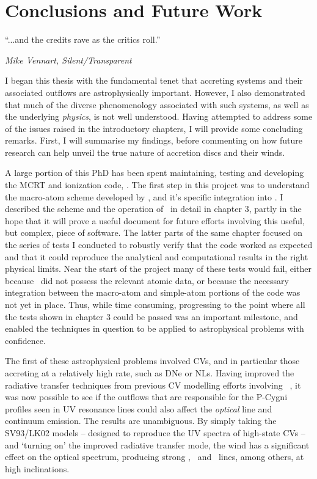\chapter{Conclusions and Future Work}

\epigraph{``...and the credits rave as the critics roll.''}
{{\sl Mike Vennart, Silent/Transparent}}

I began this thesis with the fundamental tenet that accreting systems
and their associated outflows are astrophysically important. However, I also
demonstrated that much of the diverse phenomenology associated with such systems, as well
as the underlying {\em physics}, is not well understood.  
Having attempted to address some of the issues raised in the 
introductory chapters, I will provide some concluding remarks. 
First, I will summarise my findings, before 
commenting on how future research can help unveil the true nature of 
accretion discs and their winds.

A large portion of this PhD has been spent maintaining,
testing and developing the MCRT and ionization code, \py. The first 
step in this project was to understand the macro-atom scheme
developed by \cite{lucy2002,lucy2003}, and it's specific integration
into \py. I described the scheme and the operation of \py\ in detail
in chapter 3, partly in the hope that it will prove a useful document
for future efforts involving this useful, but complex, piece of software.
The latter parts of the same chapter focused on the series of tests
I conducted to robustly verify that the code worked as expected and that 
it could reproduce the analytical and computational results in the 
right physical limits. Near the start of the project many of these tests
would fail, either because \py\ did not possess the relevant atomic data,
or because the necessary integration between the macro-atom and simple-atom
portions of the code was not yet in place. Thus, while time consuming,
progressing to the point where all the tests shown in chapter 3 could be
passed was an important milestone, and enabled the techniques in question
to be applied to astrophysical problems with confidence.

The first of these astrophysical problems involved CVs, and in particular
those accreting at a relatively high rate, such as DNe or NLs. Having 
improved the radiative transfer techniques from previous CV modelling efforts
involving \py\ \citep[LK02, ][]{noebauer2010}, it was now possible to see
if the outflows that are responsible for the P-Cygni profiles seen
in UV resonance lines could also affect the {\em optical} line and continuum
emission. The results are unambiguous. By simply taking the SV93/LK02
models -- designed to reproduce the UV spectra of high-state CVs --
and `turning on' the improved radiative transfer mode, the wind
has a significant effect on the optical spectrum, producing strong
\ha, \heiiopt\ and \heiioptnew\ lines, among others, at high inclinations.

